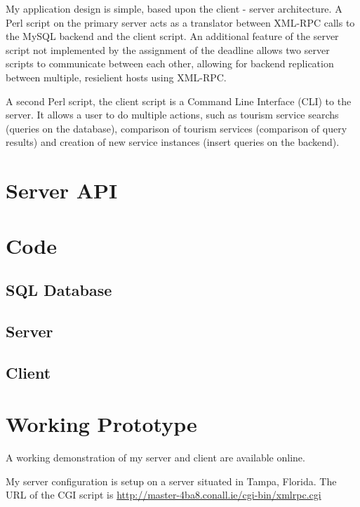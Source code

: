 \documentclass[a4paper,10pt]{article}
\begin{document}
My application design is simple, based upon the client - server
architecture. A Perl script on the primary server acts as a translator
between XML-RPC calls to the MySQL backend and the client script. An 
additional feature of the server script not implemented by the 
assignment of the deadline allows two server scripts to communicate
between each other, allowing for backend replication between multiple,
resielient hosts using XML-RPC.


A second Perl script, the client script is a Command Line Interface 
(CLI) to the server. It allows a user to do multiple actions, such as
tourism service searchs (queries on the database), comparison of tourism 
services (comparison of query results) and creation of new service
instances (insert queries on the backend).

\section{Server API}



\section{Code}

\subsection{SQL Database}


%

\subsection{Server}

\subsection{Client}

\section{Working Prototype}

A working demonstration of my server and client are available online.


My server configuration is setup on a server situated in Tampa, Florida.
The URL of the CGI script is
\url{http://master-4ba8.conall.ie/cgi-bin/xmlrpc.cgi}
\end{document}

